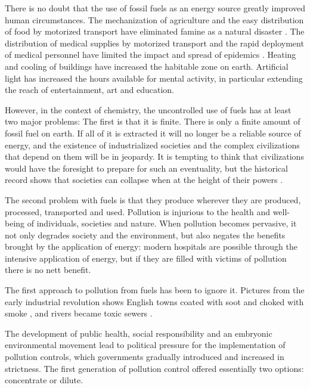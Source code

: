 There is no doubt that the use of fossil fuels as an energy source greatly
improved human circumstances. The mechanization of agriculture and the easy
distribution of food by motorized transport have eliminated famine as a natural
disaster \autocite{Angelis2007}. The distribution of medical supplies by
motorized transport and the rapid deployment of medical personnel have limited
the impact and spread of epidemics \autocite{Ministere2018}. Heating and cooling
of buildings have increased the habitable zone on earth. Artificial light has
increased the hours available for mental activity, in particular extending the
reach of entertainment, art and education.

However, in the context of chemistry, the uncontrolled use of fuels has at least
two major problems: The first is that it is finite. There is only a finite
amount of fossil fuel on earth. If all of it is extracted it will no longer be a
reliable source of energy, and the existence of industrialized societies and the
complex civilizations that depend on them will be in jeopardy. It is tempting to
think that civilizations would have the foresight to prepare for such an
eventuality, but the historical record shows that societies can collapse when at
the height of their powers \autocite{Diamond2006}.

The second problem with fuels is that they produce  wherever
they are produced, processed, transported and used. Pollution is injurious to
the health and well-being of individuals, societies and nature. When pollution
becomes pervasive, it not only degrades society and the environment, but also
negates the benefits brought by the application of energy: modern hospitals are
possible through the intensive application of energy, but if they are filled
with victims of pollution there is no nett benefit.

The first approach to pollution from fuels has been to ignore it. Pictures
from the early industrial revolution shows English towns coated with soot and
choked with smoke \autocite{Flick1980}, and rivers became toxic
sewers \autocite{Halliday2001}.

The development of public health, social responsibility \autocite{Szreter2003}
and an embryonic environmental movement \autocite{Williams1965} lead to
political pressure for the implementation of pollution controls, which
governments gradually introduced and increased in strictness. The first
generation of pollution control offered essentially two options:
concentrate or dilute.


